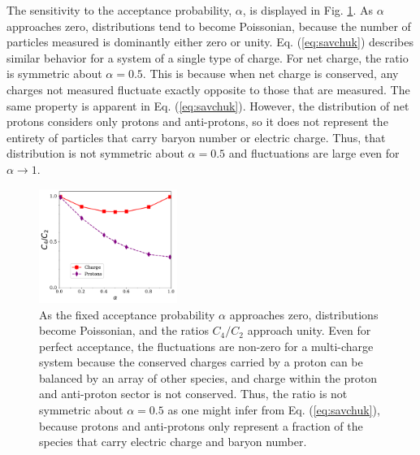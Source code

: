 The sensitivity to the acceptance probability, $\alpha$, is displayed in Fig. \ref{fig:uniform_vs_alpha}. As $\alpha$ approaches zero, distributions tend to become Poissonian, because the number of particles measured is dominantly either zero or unity. Eq. (\ref{eq:savchuk}) describes similar behavior for a system of a single type of charge. For net charge, the ratio is symmetric about $\alpha=0.5$. This is because when net charge is conserved, any charges not measured fluctuate exactly opposite to those that are measured. The same property is apparent in Eq. (\ref{eq:savchuk}). However, the distribution of net protons considers only protons and anti-protons, so it does not represent the entirety of particles that carry baryon number or electric charge. Thus, that distribution is not symmetric about $\alpha=0.5$ and fluctuations are large even for $\alpha \rightarrow 1$.
\begin{figure}
\centerline{\includegraphics[width=0.4\textwidth]{figs/m_vs_alpha}}
\caption{\label{fig:uniform_vs_alpha}
As the fixed acceptance probability $\alpha$ approaches zero, distributions become Poissonian, and the ratios $C_4/C_2$ approach unity. Even for perfect acceptance, the fluctuations are non-zero for a multi-charge system because the conserved charges carried by a proton can be balanced by an array of other species, and charge within the proton and anti-proton sector is not conserved. Thus, the ratio is not symmetric about $\alpha=0.5$ as one might infer from Eq. (\ref{eq:savchuk}), because protons and anti-protons only represent a fraction of the species that carry electric charge and baryon number.}
\end{figure}

